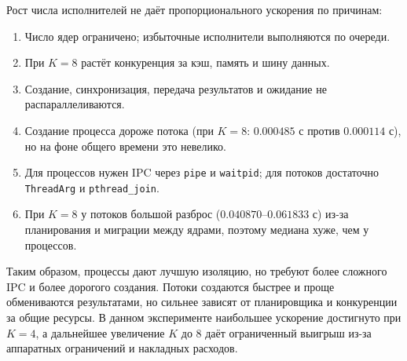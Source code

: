 Рост числа исполнителей не даёт пропорционального ускорения по причинам:
\begin{enumerate}
    \item Число ядер ограничено; избыточные исполнители выполняются по очереди.
    \item При \(K=8\) растёт конкуренция за кэш, память и шину данных.
    \item Создание, синхронизация, передача результатов и ожидание
          не распараллеливаются.
    \item Создание процесса дороже потока (при \(K=8\): \(0.000485\) с против
          \(0.000114\) с), но на фоне общего времени это невелико.
    \item Для процессов нужен IPC через \texttt{pipe} и \texttt{waitpid}; для
          потоков достаточно \texttt{ThreadArg} и \texttt{pthread\_join}.
    \item При \(K=8\) у потоков большой разброс (\(0.040870\)--\(0.061833\) с)
          из-за планирования и миграции между ядрами, поэтому медиана хуже, чем
          у процессов.
\end{enumerate}

Таким образом, процессы дают лучшую изоляцию, но требуют более сложного IPC и более
дорогого создания. Потоки создаются быстрее и проще обмениваются результатами, но
сильнее зависят от планировщика и конкуренции за общие ресурсы. В данном эксперименте
наибольшее ускорение достигнуто при \(K=4\), а дальнейшее увеличение \(K\) до 8
даёт ограниченный выигрыш из-за аппаратных ограничений и накладных расходов.